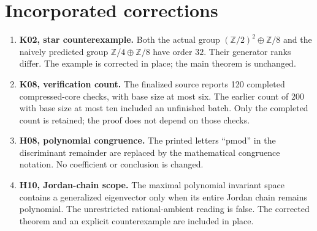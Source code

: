 \documentclass[11pt,a4paper]{article}
\theoremstyle{definition}\newtheorem{definition}[theorem]{Definition}
\theoremstyle{remark}\newtheorem{remark}[theorem]{Remark}
\newcommand{\Z}{\mathbb Z}\newcommand{\Q}{\mathbb Q}\newcommand{\F}{\mathbb F}
\numberwithin{equation}{section}
\begin{document}
\section*{Incorporated corrections}
\begin{enumerate}[leftmargin=*]
\item \textbf{K02, star counterexample.} Both the actual group $(\Z/2)^2\oplus\Z/8$ and the naively predicted group $\Z/4\oplus\Z/8$ have order $32$. Their generator ranks differ. The example is corrected in place; the main theorem is unchanged.
\item \textbf{K08, verification count.} The finalized source reports 120 completed compressed-core checks, with base size at most six. The earlier count of 200 with base size at most ten included an unfinished batch. Only the completed count is retained; the proof does not depend on those checks.
\item \textbf{H08, polynomial congruence.} The printed letters ``pmod'' in the discriminant remainder are replaced by the mathematical congruence notation. No coefficient or conclusion is changed.
\item \textbf{H10, Jordan-chain scope.} The maximal polynomial invariant space contains a generalized eigenvector only when its entire Jordan chain remains polynomial. The unrestricted rational-ambient reading is false. The corrected theorem and an explicit counterexample are included in place.
\end{enumerate}
\end{document}
